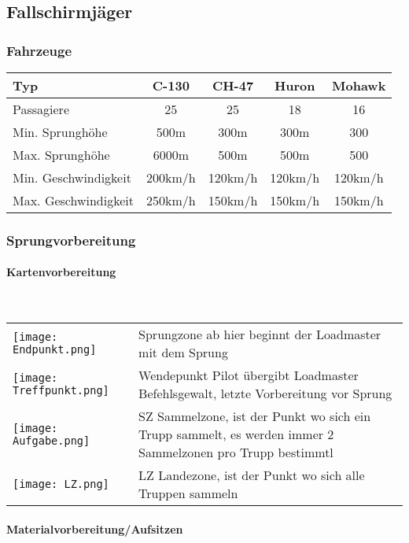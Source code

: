 \subsection{Fallschirmjäger}

\subsubsection{Fahrzeuge}
\begin{longtable}{|l|c|c|c|c|} \hline
	Typ 			&		C-130 	&	CH-47 	&	Huron		&		 Mohawk	\\ \hline
	Passagiere 		&		25 		&	25 		&	18 		&		16		\\ \hline
	Min. Sprunghöhe 	&		500m 		&	300m 		&	300m 		&		300		\\ \hline
	Max. Sprunghöhe 	&		6000m 	&	500m 		&	500m 		&		500 		\\ \hline
	Min. Geschwindigkeit& 		200km/h 	&	120km/h 	&	120km/h 	&		120km/h	\\ \hline
	Max. Geschwindigkeit& 		250km/h 	&	150km/h 	&	150km/h 	&		150km/h 	\\ \hline
\end{longtable}

\subsubsection{Sprungvorbereitung}
\paragraph{Kartenvorbereitung} \ \\
\begin{tabular}{p{3cm} p{15cm}}
	\texttt{[image: Endpunkt.png]}		&		Sprungzone ab hier beginnt der Loadmaster mit dem Sprung\\
	\texttt{[image: Treffpunkt.png]} 		&		Wendepunkt Pilot übergibt Loadmaster Befehlsgewalt, letzte Vorbereitung vor Sprung\\
	\texttt{[image: Aufgabe.png]}		&		SZ Sammelzone, ist der Punkt wo sich ein Trupp sammelt, es werden immer 2 Sammelzonen pro Trupp bestimmtl \\
	\texttt{[image: LZ.png]}			&		LZ Landezone, ist der Punkt wo sich alle Truppen sammeln \\
\end{tabular}

\paragraph{Materialvorbereitung/Aufsitzen}  \ \\

